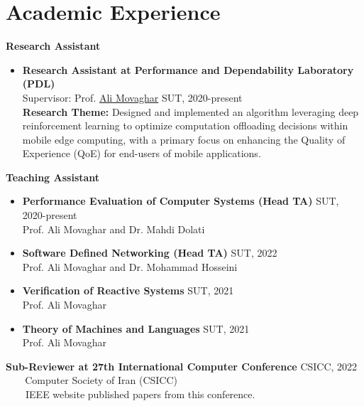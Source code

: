 \documentclass[11pt]{article}
\begin{document}
\section{Academic Experience}

\large\large\textbf{Research Assistant} \vspace{-2mm}
\begin{itemize}
	\item \textbf{Research Assistant at Performance and Dependability Laboratory (PDL)} \href{https://pdl.ce.sharif.edu}{\small \faExternalLink}
	\\ Supervisor: Prof. \href{https://scholar.google.com/citations?user=BXNelwwAAAAJ\&hl=en}{Ali Movaghar} \hfill SUT, 2020-present\\
	\textbf{Research Theme:} Designed and implemented an algorithm leveraging deep reinforcement learning to optimize computation offloading decisions within mobile edge computing, with a primary focus on enhancing the Quality of Experience (QoE) for end-users of mobile applications.
\end{itemize}
\large\large\textbf{Teaching Assistant}  \vspace{-2mm}

\begin{itemize}

	\item \textbf{Performance Evaluation of Computer Systems (Head TA)} \hfill SUT, 2020-present
		\\ Prof. Ali Movaghar and Dr. Mahdi Dolati \vspace{-2mm} \href{https://scholar.google.com/citations?user=b7A2CXYAAAAJ&hl=en&oi=ao}{\small \faExternalLink}
	\item \textbf{Software Defined Networking (Head TA)} \hfill SUT, 2022
		\\ Prof. Ali Movaghar and Dr. Mohammad Hosseini \vspace{-2mm} \href{https://scholar.google.com/citations?user=iRO-DVoAAAAJ&hl=en&oi=ao}{\small \faExternalLink}
	\item \textbf{Verification of Reactive Systems} \hfill SUT, 2021
		\\ Prof. Ali Movaghar \vspace{-2mm}
	\item \textbf{Theory of Machines and Languages} \hfill SUT, 2021
		\\ Prof. Ali Movaghar \vspace{-2mm}

\end{itemize}
\large\large\textbf{Sub-Reviewer at 27th International Computer Conference} \hfill CSICC, 2022 \\
  \textcolor{white}{iiiiiii}Computer Society of Iran (CSICC) \href{http://csi.org.ir/csicc2022/index-2.html}{\small \faExternalLink}\\ \textcolor{white}{iiiiii} IEEE website published papers from this conference. \href{https://ieeexplore.ieee.org/xpl/conhome/9780464/proceeding}{\small \faExternalLink}
\end{document}
